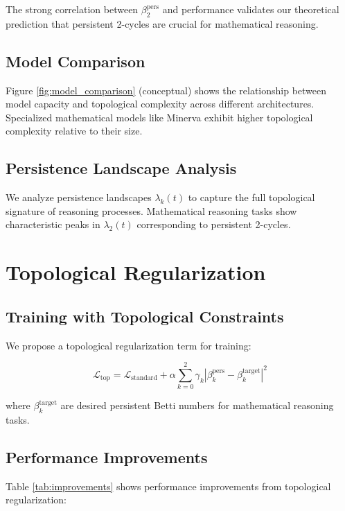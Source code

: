 \documentclass[11pt,a4paper]{article}
\begin{document}
The strong correlation between $\beta_2^{\text{pers}}$ and performance validates our theoretical prediction that persistent 2-cycles are crucial for mathematical reasoning.

\subsection{Model Comparison}

Figure \ref{fig:model_comparison} (conceptual) shows the relationship between model capacity and topological complexity across different architectures. Specialized mathematical models like Minerva exhibit higher topological complexity relative to their size.

\subsection{Persistence Landscape Analysis}

We analyze persistence landscapes $\lambda_k(t)$ to capture the full topological signature of reasoning processes. Mathematical reasoning tasks show characteristic peaks in $\lambda_2(t)$ corresponding to persistent 2-cycles.

\section{Topological Regularization}

\subsection{Training with Topological Constraints}

We propose a topological regularization term for training:

$$\mathcal{L}_{\text{top}} = \mathcal{L}_{\text{standard}} + \alpha \sum_{k=0}^2 \gamma_k \left|\beta_k^{\text{pers}} - \beta_k^{\text{target}}\right|^2$$

where $\beta_k^{\text{target}}$ are desired persistent Betti numbers for mathematical reasoning tasks.

\subsection{Performance Improvements}

Table \ref{tab:improvements} shows performance improvements from topological regularization:
\end{document}
